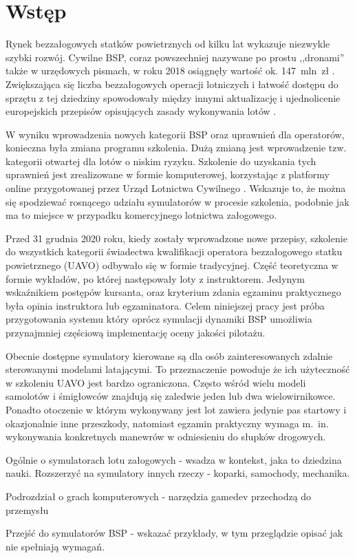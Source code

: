\newpage
\section{Wstęp}

Rynek bezzałogowych statków powietrznych od kilku lat wykazuje niezwykle szybki rozwój. Cywilne BSP, coraz powszechniej nazywane po prostu ,,dronami'' także w urzędowych pismach, w roku 2018 osiągnęły wartość ok. 147~mln~zł \cite{bialaksiega2019}. Zwiększająca się liczba bezzałogowych operacji lotniczych i łatwość dostępu do sprzętu z tej dziedziny spowodowały między innymi aktualizację i ujednolicenie europejskich przepisów opisujących zasady wykonywania lotów \cite{eu-945-2019}.

W wyniku wprowadzenia nowych kategorii BSP oraz uprawnień dla operatorów, konieczna była zmiana programu szkolenia. Dużą zmianą jest wprowadzenie tzw. kategorii otwartej dla lotów o niskim ryzyku. Szkolenie do uzyskania tych uprawnień jest zrealizowane w formie komputerowej, korzystając z platformy online przygotowanej przez Urząd Lotnictwa Cywilnego \cite{ulc2019}. Wskazuje to, że można się spodziewać rosnącego udziału symulatorów w procesie szkolenia, podobnie jak ma to miejsce w przypadku komercyjnego lotnictwa załogowego.

Przed 31 grudnia 2020 roku, kiedy zostały wprowadzone nowe przepisy, szkolenie do wszystkich kategorii świadectwa kwalifikacji operatora bezzałogowego statku powietrznego (UAVO) odbywało się w formie tradycyjnej. Część teoretyczna w formie wykładów, po której następowały loty z instruktorem. Jedynym wskaźnikiem postępów kursanta, oraz kryterium zdania egzaminu praktycznego była opinia instruktora lub egzaminatora. Celem niniejszej pracy jest próba przygotowania systemu który oprócz symulacji dynamiki BSP umożliwia przynajmniej częściową implementację oceny jakości pilotażu.

Obecnie dostępne symulatory kierowane są dla osób zainteresowanych zdalnie sterowanymi modelami latającymi. To przeznaczenie powoduje że ich użyteczność w szkoleniu UAVO jest bardzo ograniczona. Często wśród wielu modeli samolotów i śmigłowców znajdują się zaledwie jeden lub dwa wielowirnikowce. Ponadto otoczenie w którym wykonywany jest lot zawiera jedynie pas startowy i okazjonalnie inne przeszkody, natomiast egzamin praktyczny wymaga m.~in. wykonywania konkretnych manewrów w odniesieniu do słupków drogowych.

\begin{todo}
Ogólnie o symulatorach lotu załogowych - wsadza w kontekst, jaka to dziedzina nauki. Rozszerzyć na symulatory innych rzeczy - koparki, samochody, mechanika.

Podrozdział o grach komputerowych - narzędzia gamedev przechodzą do przemysłu

Przejść do symulatorów BSP - wskazać przykłady, w tym przeglądzie opisać jak nie spełniają wymagań.
\end{todo}
